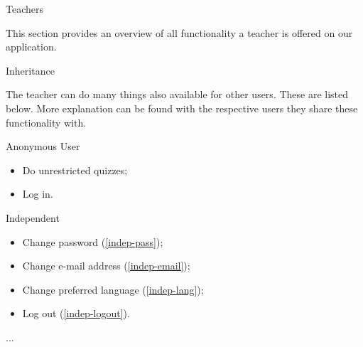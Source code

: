 
\begin{section}{Teachers}

    This section provides an overview of all functionality a teacher is offered
    on our application.

    \begin{subsection}{Inheritance}

        The teacher can do many things also available for other users. These are
        listed below. More explanation can be found with the respective users
        they share these functionality with.

        \begin{subsubsection}{Anonymous User}

            \begin{itemize}
                \item Do unrestricted quizzes;
                \item Log in.
            \end{itemize}

        \end{subsubsection}

        \begin{subsubsection}{Independent}

            \begin{itemize}
                \item Change password           (\ref{indep-pass});
                \item Change e-mail address     (\ref{indep-email});
                \item Change preferred language (\ref{indep-lang});
                \item Log out                   (\ref{indep-logout}).
            \end{itemize}

        \end{subsubsection}

    \end{subsection}

    \begin{subsection}{...}
    \end{subsection}

\end{section}
